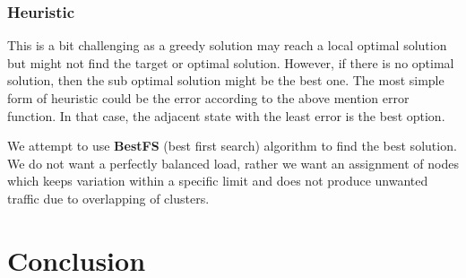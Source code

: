 \documentclass{article}
\begin{document}
	\subsubsection{Heuristic}
	This is a bit challenging as a greedy solution may reach a local optimal solution but might not find the target or optimal solution. However, if there is no optimal solution, then the sub optimal solution might be the best one. The most simple form of heuristic could be the error according to the above mention error function. In that case, the adjacent state with the least error is the best option.
	
	We attempt to use \textbf{BestFS} (best first search) algorithm to find the best solution. We do not want a perfectly balanced load, rather we want an assignment of nodes which keeps variation within a specific limit and does not produce unwanted traffic due to overlapping of clusters.
	
	\section{Conclusion}
	
	
	
\end{document}
